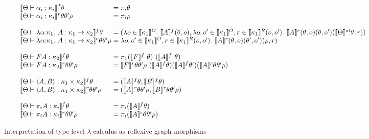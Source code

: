 \documentclass{sigplanconf}
\theoremstyle{examplestyle}
\newcommand{\sem}[1]{\llbracket #1 \rrbracket}
\newcommand{\semKU}[1]{\llbracket #1 \rrbracket^O}
\newcommand{\semKR}[1]{\llbracket #1 \rrbracket^R}
\newcommand{\semKI}[1]{\llbracket #1 \rrbracket^{\mathrm{id}}}
\begin{document}
\begin{figure*}[t]
  \begin{displaymath}
    \begin{array}{l@{\hspace{0.3em}}c@{\hspace{0.3em}}l}
      \sem{\Theta \vdash \alpha_i : \kappa_i}^f \theta & = & \pi_i \theta \\
      \sem{\Theta \vdash \alpha_i : \kappa_i}^r\theta\theta' \rho & = & \pi_i \rho \\
      \\
      \sem{\Theta \vdash \lambda \alpha \mathord: \kappa_1.~A : \kappa_1 \to \kappa_2}^f \theta & = & (
      \begin{array}[t]{@{}l}
        \lambda o \in \semKU{\kappa_1}.\ \sem{A}^f(\theta, o), 
        \lambda o, o' \in \semKU{\kappa_1}, r \in \semKR{\kappa_1}(o,o').\ \sem{A}^r(\theta,o)(\theta,o')(\semKI{\Theta}\theta, r))
      \end{array}\\
      \sem{\Theta \vdash \lambda \alpha \mathord: \kappa_1.~A : \kappa_1 \to \kappa_2}^r \theta\theta' \rho & = &
      \lambda o,o' \in \semKU{\kappa_1}, r \in \semKR{\kappa_1}(o,o').\ \sem{A}^r(\theta,o)(\theta',o')(\rho, r) \\
      \\
      \sem{\Theta \vdash F A : \kappa_2}^f \theta & = & \pi_1 (\sem{F}^f\ \theta)\ (\sem{A}^f\ \theta)\\
      \sem{\Theta \vdash F A : \kappa_2}^r\theta\theta'\rho & = & \sem{F}^r\theta\theta'\rho\ (\sem{A}^f \theta)(\sem{A}^f \theta')(\sem{A}^r\theta\theta'\rho) \\
      \\
      \sem{\Theta \vdash \langle A, B \rangle : \kappa_1 \times \kappa_2}^f \theta & = & (\sem{A}^f \theta, \sem{B}^f \theta) \\
      \sem{\Theta \vdash \langle A, B \rangle : \kappa_1 \times \kappa_2}^r \theta \theta' \rho & = & (\sem{A}^r \theta \theta' \rho, \sem{B}^r \theta \theta' \rho) \\
      \\
      \sem{\Theta \vdash \pi_i A : \kappa_i}^f \theta & = & \pi_i (\sem{A}^f \theta) \\
      \sem{\Theta \vdash \pi_i A : \kappa_i}^r \theta \theta' \rho & = & \pi_i (\sem{A}^r \theta \theta' \rho)
    \end{array}
  \end{displaymath}
  \caption{Interpretation of type-level $\lambda$-calculus as reflexive graph morphisms}
  \label{fig:type-level-lambda-calc}
\end{figure*}
\end{document}

